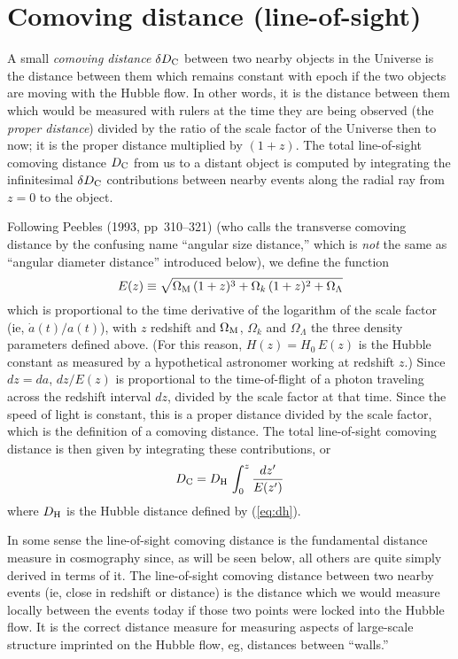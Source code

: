 \section{Comoving distance (line-of-sight)}

A small {\em comoving distance\/} $\delta D_{\rm C}$ between two
nearby objects in the Universe is the distance between them which
remains constant with epoch if the two objects are moving with the
Hubble flow.  In other words, it is the distance between them which
would be measured with rulers at the time they are being observed (the
{\em proper distance}) divided by the ratio of the scale factor of the
Universe then to now; it is the proper distance multiplied by $(1+z)$.
The total line-of-sight comoving distance $D_{\rm C}$ from us to a
distant object is computed by integrating the infinitesimal $\delta
D_{\rm C}$ contributions between nearby events along the radial ray
from $z=0$ to the object.

Following Peebles (1993, pp~310--321) (who calls the transverse
comoving distance by the confusing name ``angular size distance,''
which is {\em not\/} the same as ``angular diameter distance''
introduced below), we define the function
\begin{equation}
\label{eq:ez}
E(z)\equiv\sqrt{\Omega_{\rm M}\,(1+z)^3+\Omega_k\,(1+z)^2+\Omega_{\Lambda}}
\end{equation}
which is proportional to the time derivative of the logarithm of the
scale factor (ie, $\dot{a}(t)/a(t)$), with $z$ redshift and
$\Omega_{\rm M}$, $\Omega_k$ and $\Omega_{\Lambda}$ the three density
parameters defined above.  (For this reason, $H(z)=H_0\,E(z)$ is the
Hubble constant as measured by a hypothetical astronomer working at
redshift $z$.)  Since $dz=da$, $dz/E(z)$ is proportional to the
time-of-flight of a photon traveling across the redshift interval
$dz$, divided by the scale factor at that time.  Since the speed of
light is constant, this is a proper distance divided by the scale
factor, which is the definition of a comoving distance.  The total
line-of-sight comoving distance is then given by integrating these
contributions, or
\begin{equation}
D_{\rm C} = D_{\rm H}\,\int_0^z\frac{dz'}{E(z')}
\end{equation}
where $D_{\rm H}$ is the Hubble distance defined by (\ref{eq:dh}).

In some sense the line-of-sight comoving distance is the fundamental
distance measure in cosmography since, as will be seen below, all
others are quite simply derived in terms of it.  The line-of-sight
comoving distance between two nearby events (ie, close in redshift or
distance) is the distance which we would measure locally between the
events today if those two points were locked into the Hubble flow.  It
is the correct distance measure for measuring aspects of large-scale
structure imprinted on the Hubble flow, eg, distances between
``walls.''


